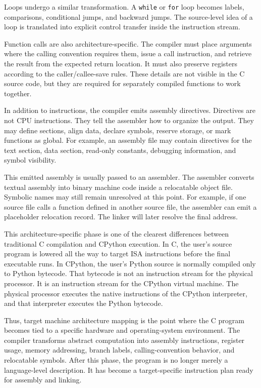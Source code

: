 Loops undergo a similar transformation. A \texttt{while} or \texttt{for} loop becomes labels, comparisons, conditional jumps, and backward jumps. The source-level idea of a loop is translated into explicit control transfer inside the instruction stream.

Function calls are also architecture-specific. The compiler must place arguments where the calling convention requires them, issue a call instruction, and retrieve the result from the expected return location. It must also preserve registers according to the caller/callee-save rules. These details are not visible in the C source code, but they are required for separately compiled functions to work together.

In addition to instructions, the compiler emits assembly directives. Directives are not CPU instructions. They tell the assembler how to organize the output. They may define sections, align data, declare symbols, reserve storage, or mark functions as global. For example, an assembly file may contain directives for the text section, data section, read-only constants, debugging information, and symbol visibility.

This emitted assembly is usually passed to an assembler. The assembler converts textual assembly into binary machine code inside a relocatable object file. Symbolic names may still remain unresolved at this point. For example, if one source file calls a function defined in another source file, the assembler can emit a placeholder relocation record. The linker will later resolve the final address.

This architecture-specific phase is one of the clearest differences between traditional C compilation and CPython execution. In C, the user's source program is lowered all the way to target ISA instructions before the final executable runs. In CPython, the user's Python source is normally compiled only to Python bytecode. That bytecode is not an instruction stream for the physical processor. It is an instruction stream for the CPython virtual machine. The physical processor executes the native instructions of the CPython interpreter, and that interpreter executes the Python bytecode.

Thus, target machine architecture mapping is the point where the C program becomes tied to a specific hardware and operating-system environment. The compiler transforms abstract computation into assembly instructions, register usage, memory addressing, branch labels, calling-convention behavior, and relocatable symbols. After this phase, the program is no longer merely a language-level description. It has become a target-specific instruction plan ready for assembly and linking.



